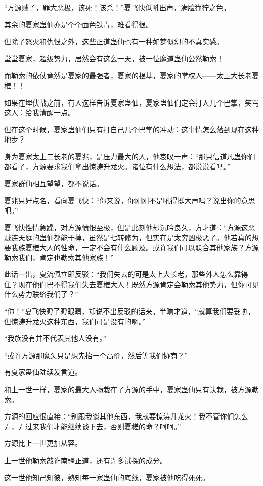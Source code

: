 \begin{this_body}
“方源贼子，罪大恶极，该死！该杀！”夏飞快低吼出声，满脸狰狞之色。

其余的夏家蛊仙亦是个个面色铁青，难看得很。

但除了怒火和仇恨之外，这些正道蛊仙也有一种如梦似幻的不真实感。

堂堂夏家，超级势力，居然会有这么一天，被一位魔道蛊仙公然勒索！

而勒索的依仗竟然是夏家的最强者，夏家的根基，夏家的掌权人——太上大长老夏槎！！

如果在埋伏战之前，有人这样告诉夏家蛊仙，夏家蛊仙们定会打人几个巴掌，笑骂这人：给我清醒一点。

但在这个时候，夏家蛊仙们只有打自己几个巴掌的冲动：这事情怎么落到现在这种地步？

身为夏家太上二长老的夏兆，是压力最大的人，他哀叹一声：“那只信道凡蛊你们都看了，方源要求我们拿出惊涛升龙火。诸位有什么想法，都说说看吧。”

夏家群仙相互望望，都不说话。

夏兆只好点名，看向夏飞快：“你来说，你刚刚不是吼得挺大声吗？说出你的意思吧。”

夏飞快性情急躁，对方源愤恨至极，但是此刻他却沉吟良久，方才道：“方源这恶贼连天庭的蛊仙都能干掉，虽然是七转修为，但实在是太穷凶极恶了。他若真的想要我族夏槎大人的性命，一定不会有什么顾及。或许我们可以联合其他家族？方源勒索我们，肯定也勒索其他家族！”

此话一出，夏流佩立即反驳：“我们失去的可是太上大长老，那些外人怎么靠得住？现在他们巴不得我们失去夏槎大人！既然方源肯定会勒索其他势力，但你可见什么势力联络我们了？”

“你！”夏飞快瞪了瞪眼睛，却说不出反驳的话来。半晌才道，“就算我们要妥协，但惊涛升龙火这种东西，我们可是没有的啊。”

“我族没有并不代表其他人没有。”

“或许方源那魔头只是想先抬一个高价，然后等我们协商？”

有夏家蛊仙陆续发言道。

和上一世一样，夏家的最大人物栽在了方源的手中，夏家蛊仙只有认栽，被方源勒索。

方源的回应很直接：“别跟我谈其他东西，我就要惊涛升龙火！我不管你们怎么弄，弄过来我们才能继续谈下去，否则夏槎的命？呵呵。”

方源比上一世更加从容。

上一世他勒索敲诈南疆正道，还有许多试探的成分。

这一世他知己知彼，熟知每一家蛊仙的底线，夏家被他吃得死死。


\end{this_body}

